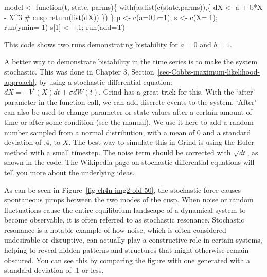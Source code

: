 \documentclass[
  a4paper,
  DIV=11,
  numbers=noendperiod]{scrreprt}
\newenvironment{Shaded}{\begin{snugshade}}{\end{snugshade}}
\newcommand{\AttributeTok}[1]{\textcolor[rgb]{0.40,0.45,0.13}{#1}}
\newcommand{\CommentTok}[1]{\textcolor[rgb]{0.37,0.37,0.37}{#1}}
\newcommand{\ControlFlowTok}[1]{\textcolor[rgb]{0.00,0.23,0.31}{#1}}
\newcommand{\DecValTok}[1]{\textcolor[rgb]{0.68,0.00,0.00}{#1}}
\newcommand{\FunctionTok}[1]{\textcolor[rgb]{0.28,0.35,0.67}{#1}}
\newcommand{\NormalTok}[1]{\textcolor[rgb]{0.00,0.23,0.31}{#1}}
\newcommand{\OtherTok}[1]{\textcolor[rgb]{0.00,0.23,0.31}{#1}}
\newcommand{\SpecialCharTok}[1]{\textcolor[rgb]{0.37,0.37,0.37}{#1}}
\begin{document}
\begin{Shaded}
\begin{Highlighting}[]
\NormalTok{model }\OtherTok{\textless{}{-}} \ControlFlowTok{function}\NormalTok{(t, state, parms)\{}
  \FunctionTok{with}\NormalTok{(}\FunctionTok{as.list}\NormalTok{(}\FunctionTok{c}\NormalTok{(state,parms)),\{}
\NormalTok{    dX }\OtherTok{\textless{}{-}}\NormalTok{  a }\SpecialCharTok{+}\NormalTok{ b}\SpecialCharTok{*}\NormalTok{X }\SpecialCharTok{{-}}\NormalTok{ X}\SpecialCharTok{\^{}}\DecValTok{3}        \CommentTok{\# cusp}
    \FunctionTok{return}\NormalTok{(}\FunctionTok{list}\NormalTok{(dX))}
\NormalTok{  \})}
\NormalTok{\}}
\NormalTok{p }\OtherTok{\textless{}{-}} \FunctionTok{c}\NormalTok{(}\AttributeTok{a=}\DecValTok{0}\NormalTok{,}\AttributeTok{b=}\DecValTok{1}\NormalTok{); s }\OtherTok{\textless{}{-}} \FunctionTok{c}\NormalTok{(}\AttributeTok{X=}\NormalTok{.}\DecValTok{1}\NormalTok{); }\FunctionTok{run}\NormalTok{(}\AttributeTok{ymin=}\SpecialCharTok{{-}}\DecValTok{1}\NormalTok{)}
\NormalTok{s[}\DecValTok{1}\NormalTok{] }\OtherTok{\textless{}{-}} \SpecialCharTok{{-}}\NormalTok{.}\DecValTok{1}\NormalTok{; }\FunctionTok{run}\NormalTok{(}\AttributeTok{add=}\NormalTok{T)}
\end{Highlighting}
\end{Shaded}

This code shows two runs demonstrating bistability for \(a = 0\) and
\(b = 1\).

A better way to demonstrate bistability in the time series is to make
the system stochastic. This was done in Chapter 3,
Section~\ref{sec-Cobbs-maximum-likelihood-approach}, by using a
stochastic differential equation: \(dX = - V^{'}(X)dt + \sigma dW(t)\).
Grind has a great trick for this. With the `after' parameter in the
function call, we can add discrete events to the system. `After' can
also be used to change parameter or state values after a certain amount
of time or after some condition (see the manual). We use it here to add
a random number sampled from a normal distribution, with a mean of 0 and
a standard deviation of .4, to \(X\). The best way to simulate this in
Grind is using the Euler method with a small timestep. The noise term
should be corrected with \(\sqrt{dt}\), as shown in the code. The
Wikipedia page on stochastic differential equations will tell you more
about the underlying ideas.

As can be seen in Figure~\ref{fig-ch4n-img2-old-50}, the stochastic
force causes spontaneous jumps between the two modes of the cusp. When
noise or random fluctuations cause the entire equilibrium landscape of a
dynamical system to become observable, it is often referred to as
stochastic resonance. Stochastic resonance is a notable example of how
noise, which is often considered undesirable or disruptive, can actually
play a constructive role in certain systems, helping to reveal hidden
patterns and structures that might otherwise remain obscured. You can
see this by comparing the figure with one generated with a standard
deviation of .1 or less.
\end{document}
